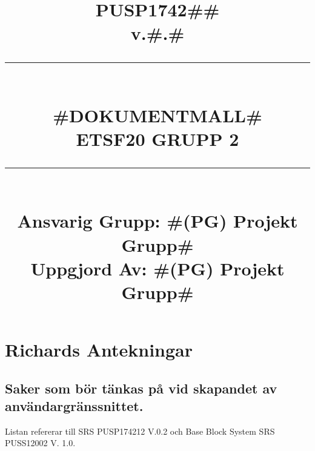 \documentclass[paper=a4, fontsize=11pt,twoside]{article}
\title{
		\documentNumber{#1}																						
		\documentVersion{#2}																				
		\HRule{0.5pt} \\ %
		\LARGE \textbf{\uppercase{#3}} \\
		\large \textbf{\uppercase{ETSF20 Grupp 2}} 
		\HRule{2pt} \\ [1.5cm]    
		\normalsize            
		\documentResponsible{#4} \\ 
		\documentCreator{#4}  
	}
\newcommand{\HRule}[1]{\rule{\linewidth}{#1}}
\newcommand{\documentNumber}[1]{\centering PUSP1742#1 \\[1.0cm]}
\newcommand{\documentVersion}[1]{\centering \small{v.#1} \\[1.0cm]}
\newcommand{\documentResponsible}[1]{\centering  Ansvarig Grupp: #1}
\newcommand{\documentCreator}[1]{\centering Uppgjord Av: #1}
\newcommand{\grouptitlepage}[4]{ 
	\title{
		\documentNumber{#1}																						
		\documentVersion{#2}																				
		\HRule{0.5pt} \\ %
		\LARGE \textbf{\uppercase{#3}} \\
		\large \textbf{\uppercase{ETSF20 Grupp 2}} 
		\HRule{2pt} \\ [1.5cm]    
		\normalsize            
		\documentResponsible{#4} \\ 
		\documentCreator{#4}  
	}																							
	\maketitle																							
	\thispagestyle{empty} 																					
	\newpage 
}
\begin{document}
\grouptitlepage
{\#\#}
{\#.\#}
{\#Dokumentmall\#}
{\#(PG) Projekt Grupp\#}
\tableofcontents

\section{Richards Antekningar}

\subsection{Saker som bör tänkas på vid skapandet av användargränssnittet.}
Listan refererar till SRS PUSP174212 V.0.2 och Base Block System SRS PUSS12002 V. 1.0.
\end{document}
